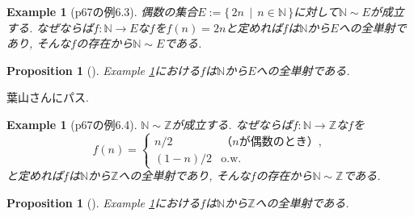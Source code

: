 \documentclass[a4j,dvipdfmx,10pt]{ujreport}
\makeatletter
\theoremstyle{mystyle}
\newtheorem{my-proposition}[my-theorem]{Proposition}
\newtheorem{my-example}[my-theorem]{Example}
\newcommand{\thmsymbol}{$\blacksquare$}
\newenvironment{proposition}[1][]{
  \begin{my-proposition}[#1]%
  \renewcommand{\qedsymbol}{\thmsymbol}\pushQED{\qed}}%
  {\popQED\end{my-proposition}
}
\newenvironment{example}[1][]{
  \begin{my-example}[#1]%
  \renewcommand{\qedsymbol}{\thmsymbol}\pushQED{\qed}}%
  {\popQED\end{my-example}
}
\renewcommand{\proofname}{Proof}
\renewenvironment{proof}[1][\proofname]{\par
  \pushQED{\qed}%
  \normalfont \topsep6\p@\@plus6\p@\relax
  \trivlist
  \item[\hskip\labelsep
        \itshape
    {\bf\underline{#1}\@addpunct{\ }}]\ignorespaces
}{%
  \popQED\endtrivlist\@endpefalse
}
\newcommand{\SetBar}[2]{
  \{\,#1\,\mid\,#2\,\}
}
\newcommand{\map}[3]{#1\colon #2 \to #3}
\makeatother
\begin{document}
\begin{example}[p67の例6.3]
  \label{example:自然数全体と偶数全体は対等}
  偶数の集合$E:=\SetBar{ 2n }{ n\in \mathbb{N} }$に対して$\mathbb{N}\sim E$が成立する.
  なぜならば$\map{f}{\mathbb{N}}{E}$な$f$を$f(n)=2n$と定めれば$f$は$\mathbb{N}$から$E$への全単射であり,
  そんな$f$の存在から$\mathbb{N}\sim E$である.
\end{example}

\begin{proposition}
  Example \ref{example:自然数全体と偶数全体は対等}における$f$は$\mathbb{N}$から$E$への全単射である.
\end{proposition}

\begin{proof}
  葉山さんにパス.
\end{proof}

\begin{example}[p67の例6.4]
  \label{example:自然数全体と整数全体は対等}
  $\mathbb{N}\sim \mathbb{Z}$が成立する.
  なぜならば$\map{f}{\mathbb{N}}{\mathbb{Z}}$な$f$を
  \begin{equation*}
    f(n)=
    \begin{cases}
      n/2 & \text{（}n\text{が偶数のとき）},\\
      (1-n)/2  & \text{o.w.}
    \end{cases}
  \end{equation*}
  と定めれば$f$は$\mathbb{N}$から$\mathbb{Z}$への全単射であり,
  そんな$f$の存在から$\mathbb{N}\sim \mathbb{Z}$である.
\end{example}

\begin{proposition}
  \label{proposition:自然数全体と整数全体は対等}
  Example \ref{example:自然数全体と整数全体は対等}における$f$は$\mathbb{N}$から$\mathbb{Z}$への全単射である.
\end{proposition}
\end{document}
